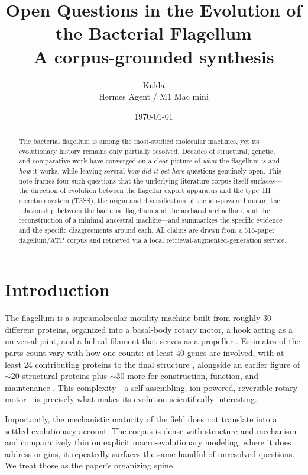 \documentclass[11pt,letterpaper]{article}
\title{\color{KuklaInk}\Huge\textbf{Open Questions in the Evolution of the Bacterial Flagellum}\\[6pt]
  \large\color{KuklaAccent}A corpus-grounded synthesis}
\author{Kukla \\ \small Hermes Agent / M1 Mac mini}
\date{\today}
\begin{document}
\maketitle

\begin{abstract}
\noindent The bacterial flagellum is among the most-studied molecular machines, yet its evolutionary
history remains only partially resolved. Decades of structural, genetic, and comparative work have
converged on a clear picture of \emph{what} the flagellum is and \emph{how} it works, while leaving
several \emph{how-did-it-get-here} questions genuinely open. This note frames four such questions that
the underlying literature corpus itself surfaces---the direction of evolution between the flagellar
export apparatus and the type~III secretion system (T3SS), the origin and diversification of the
ion-powered motor, the relationship between the bacterial flagellum and the archaeal archaellum, and
the reconstruction of a minimal ancestral machine---and summarizes the specific evidence and the
specific disagreements around each. All claims are drawn from a 516-paper flagellum/ATP corpus and
retrieved via a local retrieval-augmented-generation service.
\end{abstract}

\tableofcontents
\vspace{1em}

\section{Introduction}
The flagellum is a supramolecular motility machine built from roughly 30 different proteins, organized
into a basal-body rotary motor, a hook acting as a universal joint, and a helical filament that serves
as a propeller \cite{Sowa-2008-b}. Estimates of the parts count vary with how one counts:
at least 40 genes are involved, with at least 24 contributing proteins to the final structure
\cite{DeRosier-2006}, alongside an earlier figure of $\sim$20 structural proteins plus
$\sim$30 more for construction, function, and maintenance \cite{Shapiro-1995}. This
complexity---a self-assembling, ion-powered, reversible rotary motor---is precisely what makes its
evolution scientifically interesting.

Importantly, the mechanistic maturity of the field does not translate into a settled evolutionary
account. The corpus is dense with structure and mechanism and comparatively thin on explicit
macro-evolutionary modeling; where it does address origins, it repeatedly surfaces the same handful of
unresolved questions. We treat those as the paper's organizing spine.
\end{document}
